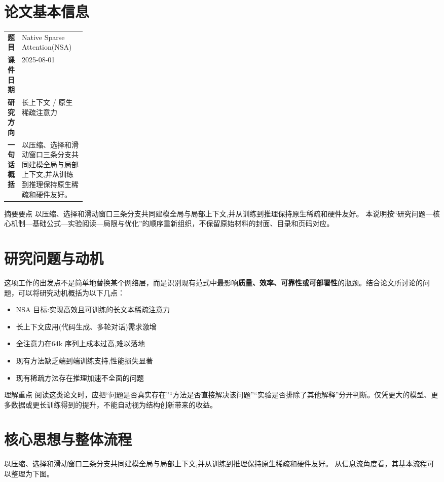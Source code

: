 \documentclass[UTF8,11pt,a4paper]{ctexart}
\newcommand{\term}[1]{\textbf{\textcolor{mainblue}{#1}}}
\begin{document}
\section{论文基本信息}
\begin{center}
\begin{tabularx}{0.94\linewidth}{>{\bfseries}p{0.18\linewidth}X}
\toprule
题目 & Native Sparse Attention(NSA)\\
课件日期 & 2025-08-01\\
研究方向 & 长上下文 / 原生稀疏注意力\\
一句话概括 & 以压缩、选择和滑动窗口三条分支共同建模全局与局部上下文,并从训练到推理保持原生稀疏和硬件友好。\\
\bottomrule
\end{tabularx}
\end{center}

\begin{infobox}{摘要要点}
以压缩、选择和滑动窗口三条分支共同建模全局与局部上下文,并从训练到推理保持原生稀疏和硬件友好。 本说明按“研究问题—核心机制—基础公式—实验阅读—局限与优化”的顺序重新组织，不保留原始材料的封面、目录和页码对应。
\end{infobox}

\section{研究问题与动机}
这项工作的出发点不是简单地替换某个网络层，而是识别现有范式中最影响\term{质量、效率、可靠性或可部署性}的瓶颈。结合论文所讨论的问题，可以将研究动机概括为以下几点：
\begin{itemize}
\item NSA 目标:实现高效且可训练的长文本稀疏注意力
\item 长上下文应用(代码生成、多轮对话)需求激增
\item 全注意力在64k 序列上成本过高,难以落地
\item 现有方法缺乏端到端训练支持,性能损失显著
\item 现有稀疏方法存在推理加速不全面的问题
\end{itemize}

\begin{notebox}{理解重点}
阅读这类论文时，应把“问题是否真实存在”“方法是否直接解决该问题”“实验是否排除了其他解释”分开判断。仅凭更大的模型、更多数据或更长训练得到的提升，不能自动视为结构创新带来的收益。
\end{notebox}

\section{核心思想与整体流程}
以压缩、选择和滑动窗口三条分支共同建模全局与局部上下文,并从训练到推理保持原生稀疏和硬件友好。 从信息流角度看，其基本流程可以整理为下图。
\end{document}
